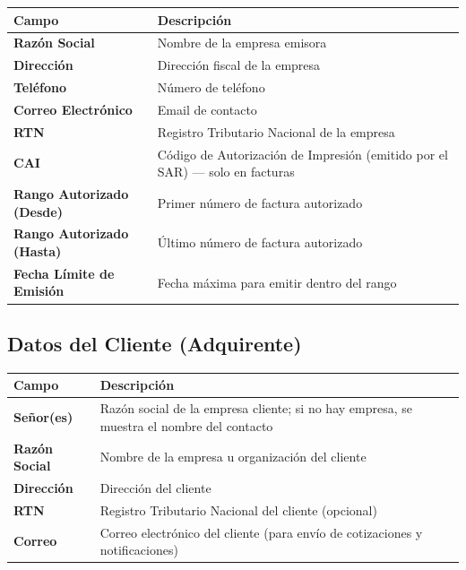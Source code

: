 \documentclass[12pt, letterpaper]{article}
\begin{document}
\begin{tabularx}{\linewidth}{>{\bfseries}l X}
  \toprule
  Campo                     & Descripción                              \\
  \midrule
  Razón Social              & Nombre de la empresa emisora             \\
  Dirección                 & Dirección fiscal de la empresa           \\
  Teléfono                  & Número de teléfono                       \\
  Correo Electrónico        & Email de contacto                        \\
  RTN                       & Registro Tributario Nacional de la empresa\\
  CAI                       & Código de Autorización de Impresión
                              (emitido por el SAR) --- solo en facturas  \\
  Rango Autorizado (Desde)  & Primer número de factura autorizado      \\
  Rango Autorizado (Hasta)  & Último número de factura autorizado      \\
  Fecha Límite de Emisión   & Fecha máxima para emitir dentro del rango\\
  \bottomrule
\end{tabularx}

\subsection{Datos del Cliente (Adquirente)}

\begin{tabularx}{\linewidth}{>{\bfseries}l X}
  \toprule
  Campo          & Descripción                                          \\
  \midrule
  Señor(es)      & Razón social de la empresa cliente; si no hay empresa,
                   se muestra el nombre del contacto                     \\
  Razón Social   & Nombre de la empresa u organización del cliente      \\
  Dirección      & Dirección del cliente                                \\
  RTN            & Registro Tributario Nacional del cliente (opcional)  \\
  Correo         & Correo electrónico del cliente (para envío de
                   cotizaciones y notificaciones)                        \\
  \bottomrule
\end{tabularx}
\end{document}
